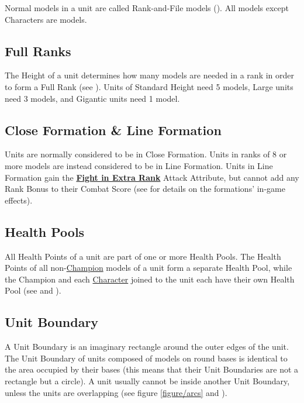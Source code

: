 Normal models in a unit are called Rank-and-File models (\rnf{}). All models except Characters are \rnf{} models.

\subsection{Full Ranks}
\label{full_ranks}

The Height of a unit determines how many models are needed in a rank in order to form a Full Rank (see ). Units of Standard Height need 5 models, Large units need 3 models, and Gigantic units need 1 model.

\subsection{Close Formation \&{} Line Formation}
\label{line_formation}

Units are normally considered to be in Close Formation. Units in ranks of 8 or more models are instead considered to be in Line Formation. Units in Line Formation gain the \hyperref[fight_in_extra_rank]{\textbf{Fight in Extra Rank}} Attack Attribute, but cannot add any Rank Bonus to their Combat Score (see  for details on the formations' in-game effects).

\subsection{Health Pools}
\label{health_pools}

All Health Points of a unit are part of one or more Health Pools. The Health Points of all non-\hyperref[champion]{Champion} \rnf{} models of a unit form a separate Health Pool, while the Champion and each \hyperref[characters]{Character} joined to the unit each have their own Health Pool (see  and ).

\subsection{Unit Boundary}
\label{boundary_rectangle}

A Unit Boundary is an imaginary rectangle around the outer edges of the unit. The Unit Boundary of units composed of models on round bases is identical to the area occupied by their bases (this means that their Unit Boundaries are not a rectangle but a circle).​
A unit usually cannot be inside another Unit Boundary, unless the units are overlapping (see figure \ref{figure/arcs} and ).

